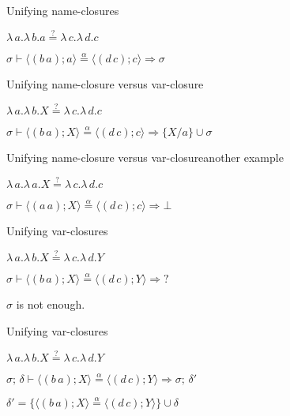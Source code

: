 \documentclass[pdf]{beamer}
\newcommand{\bd}[2] {
 #1/ #2
}
\newcommand{\clos}[2] {
\langle #2; #1 \rangle
}
\newcommand{\transition}[4] {
  $#1 \vdash #2 \stackrel{\alpha}{=} #3 \Rightarrow #4$
}
\newcommand{\eqha}[2] {
  #1\stackrel{?}{=}#2
}
\begin{document}
\begin{frame}{Unifying name-closures}

  {\centering
    $\eqha{\lambda\,a.\lambda\,b.a}{\lambda\,c.\lambda\,d.c}$

    \vspace{1cm}
    \transition
    {\sigma}
    {\clos{a}{(b\,a)}}
    {\clos{c}{(d\,c)}}
    {\sigma}
    \par}
\end{frame}

\begin{frame}{Unifying name-closure versus var-closure}

  {\centering
    $\eqha{\lambda\,a.\lambda\,b.X}{\lambda\,c.\lambda\,d.c}$

    \vspace{1cm}
    \transition
    {\sigma}
    {\clos{X}{(b\,a)}}
    {\clos{c}{(d\,c)}}
    {\{\bd{X}{a}\}\cup\sigma}
    \par}
\end{frame}

\begin{frame}{Unifying name-closure versus var-closure}{another example}

  {\centering
    $\eqha{\lambda\,a.\lambda\,a.X}{\lambda\,c.\lambda\,d.c}$

    \vspace{1cm}
    \transition
    {\sigma}
    {\clos{X}{(a\,a)}}
    {\clos{c}{(d\,c)}}
    \bot
    \par}
\end{frame}

\begin{frame}{Unifying var-closures}

 {\centering
     $\eqha{\lambda\,a.\lambda\,b.X}{\lambda\,c.\lambda\,d.Y}$

    \vspace{1cm}
   \transition
    {\sigma}
    {\clos{X}{(b\,a)}}
    {\clos{Y}{(d\,c)}}
    {?}
    \par}
   
  \vspace{1cm}
  {\centering
   $\sigma$ is not enough.
 \par}
\end{frame}

\begin{frame}{Unifying var-closures}

 {\centering
    $\eqha{\lambda\,a.\lambda\,b.X}{\lambda\,c.\lambda\,d.Y}$

    \vspace{1cm}
   \transition
    {\sigma;\,\delta}
    {\clos{X}{(b\,a)}}
    {\clos{Y}{(d\,c)}}
    {\sigma;\,\delta'}

    \vspace{1cm}
    $\delta' = \{\clos{X}{(b\,a)} \stackrel{\alpha}{=} \clos{Y}{(d\,c)}\}\cup\delta$
    \par}
\end{frame}
\end{document}
